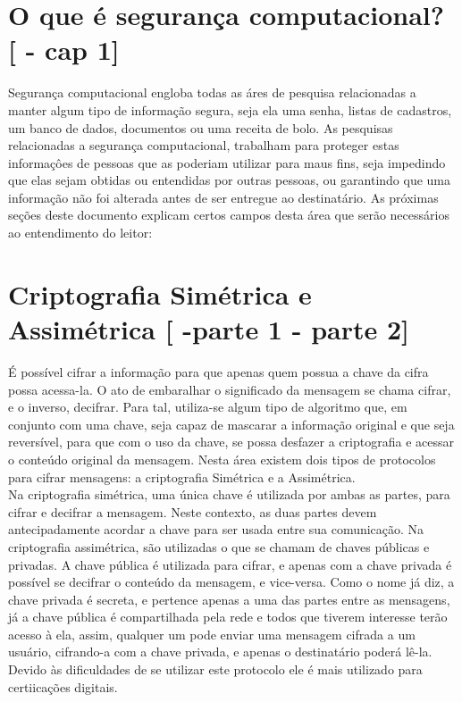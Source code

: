 \documentclass{article}
\begin{document}
	\section{O que é segurança computacional? [\cite{STALLINS} - cap 1]}
		\begin{flushleft}
			\begin{large}
			\hspace{2cm} Segurança computacional engloba todas as áres de pesquisa relacionadas a manter algum tipo de informação segura, seja ela uma senha, listas de cadastros, um banco de dados, documentos ou uma receita de bolo. As pesquisas relacionadas a segurança computacional, trabalham para proteger estas informaçôes de pessoas que as poderiam utilizar para maus fins, seja impedindo que elas sejam obtidas ou entendidas por outras pessoas, ou garantindo que uma informação não foi alterada antes de ser entregue ao destinatário. As próximas seções deste documento explicam certos campos desta área que serão necessários ao entendimento do leitor:
			\end{large}
		\end{flushleft}

	\section{Criptografia Simétrica e Assimétrica [\cite{STALLINS} -parte 1 - parte 2]}
		\begin{flushleft}
			\begin{large}

 			\hspace{2cm} É possível cifrar a informação para que apenas quem possua a chave da cifra possa acessa-la. O ato de embaralhar o significado da mensagem se chama cifrar, e o inverso, decifrar. Para tal, utiliza-se algum tipo de algoritmo que, em conjunto com uma chave, seja capaz de mascarar a informação original e que seja reversível, para que com o uso da chave, se possa desfazer a criptografia e acessar o conteúdo original da mensagem. Nesta área existem dois tipos de protocolos para cifrar mensagens: a criptografia Simétrica e a Assimétrica. \\
			\hspace{2cm}Na criptografia simétrica, uma única chave é utilizada por ambas as partes, para cifrar e decifrar a mensagem. Neste contexto, as duas partes devem antecipadamente acordar a chave para ser usada entre sua comunicação. Na criptografia assimétrica, são utilizadas o que se chamam de chaves públicas e privadas. A chave pública é utilizada para cifrar, e apenas com a chave privada é possível se decifrar o conteúdo da mensagem, e vice-versa. Como o nome já diz, a chave privada é secreta, e pertence apenas a uma das partes entre as mensagens, já a chave pública é compartilhada pela rede e todos que tiverem interesse terão acesso à ela, assim, qualquer um pode enviar uma mensagem cifrada a um usuário, cifrando-a com a chave privada, e apenas o destinatário poderá lê-la. Devido às dificuldades de se utilizar este protocolo ele é mais utilizado para certiicações digitais.
			\end{large}		
		\end{flushleft}
\end{document}

